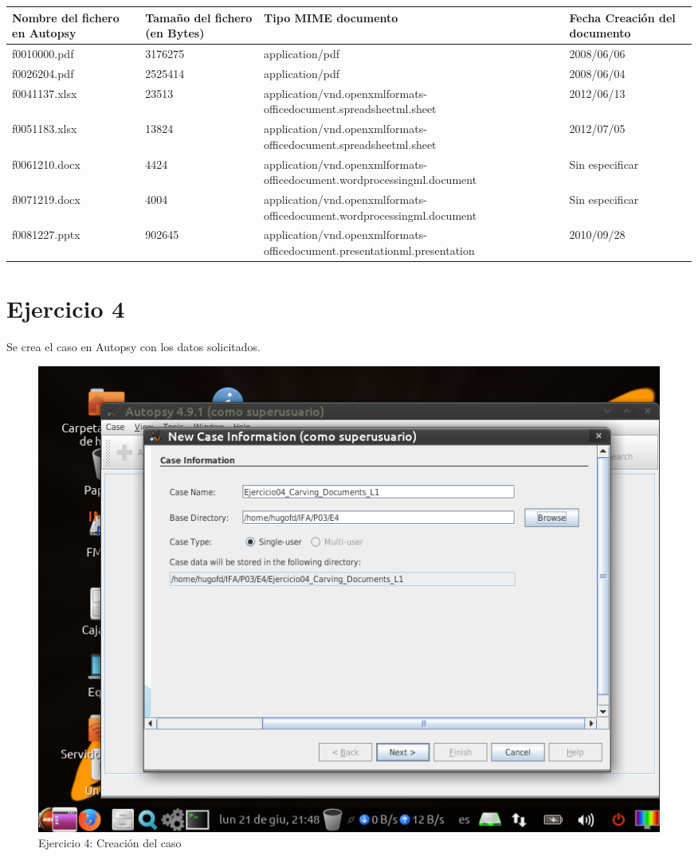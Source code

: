 \documentclass[11pt]{article}
\begin{document}
\begin{table}[H]
    \centering
    \begin{tabular}{|p{3cm}|p{2cm}|p{8cm}|p{2cm}|}
        \hline
        Nombre del fichero en Autopsy & Tamaño del fichero (en Bytes) & Tipo MIME documento & Fecha Creación del documento \\
        \hline\hline
        f0010000.pdf & 3176275 & application/pdf & 2008/06/06 \\
        \hline
        f0026204.pdf & 2525414 & application/pdf & 2008/06/04 \\
        \hline
        f0041137.xlsx & 23513 & application/vnd.openxmlformats-officedocument.spreadsheetml.sheet & 2012/06/13 \\
        \hline
        f0051183.xlsx & 13824 & application/vnd.openxmlformats-officedocument.spreadsheetml.sheet & 2012/07/05 \\
        \hline
        f0061210.docx & 4424 & application/vnd.openxmlformats-officedocument.wordprocessingml.document & Sin especificar \\
        \hline
        f0071219.docx & 4004 & application/vnd.openxmlformats-officedocument.wordprocessingml.document & Sin especificar \\
        \hline
        f0081227.pptx & 902645 & application/vnd.openxmlformats-officedocument.presentationml.presentation & 2010/09/28 \\
        \hline
    \end{tabular}
\end{table}

\section{Ejercicio 4}
Se crea el caso en Autopsy con los datos solicitados.

\begin{figure}[H]
    \caption{Ejercicio 4: Creación del caso}
    \centering
    \includegraphics[scale=0.7]{e4-1.png}
\end{figure}
\end{document}
